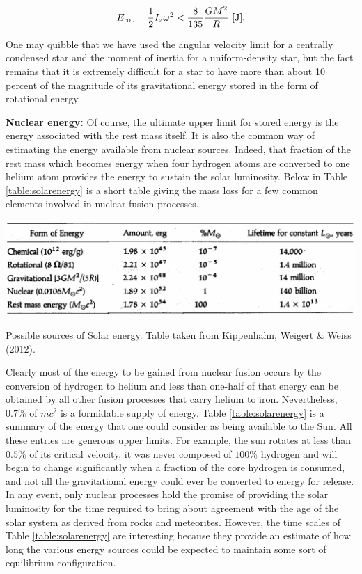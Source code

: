 \documentclass[a4paper,10pt]{article}
\begin{document}
\begin{align*}
    E_{\rm rot} = \frac{1}{2}I_z\omega^2 < \frac{8}{135}\frac{GM^2}{R} ~ [{\rm J}].
\end{align*}

{\noindent}One may quibble that we have used the angular velocity limit for a centrally condensed star and the moment of inertia for a uniform-density star, but the fact remains that it is extremely difficult for a star to have more than about 10 percent of the magnitude of its gravitational energy stored in the form of rotational energy.

{\noindent}\textbf{Nuclear energy:} Of course, the ultimate upper limit for stored energy is the energy associated with the rest mass itself. It is also the common way of estimating the energy available from nuclear sources. Indeed, that fraction of the rest mass which becomes energy when four hydrogen atoms are converted to one helium atom provides the energy to sustain the solar luminosity. Below in Table \ref{table:solarenergy} is a short table giving the mass loss for a few common elements involved in nuclear fusion processes.

\begin{table}[h]
    \centering
    \includegraphics[width=14cm]{figures/SolarEnergy.png}
    \caption{\footnotesize{Possible sources of Solar energy. Table taken from Kippenhahn, Weigert \& Weiss (2012).}}
    \label{table:solarenergy}
\end{table}

{\noindent}Clearly most of the energy to be gained from nuclear fusion occurs by the conversion of hydrogen to helium and less than one-half of that energy can be obtained by all other fusion processes that carry helium to iron. Nevertheless, $0.7\%$ of $mc^2$ is a formidable supply of energy. Table \ref{table:solarenergy} is a summary of the energy that one could consider as being available to the Sun. All these entries are generous upper limits. For example, the sun rotates at less than $0.5\%$ of its critical velocity, it was never composed of $100\%$ hydrogen and will begin to change significantly when a fraction of the core hydrogen is consumed, and not all the gravitational energy could ever be converted to energy for release. In any event, only nuclear processes hold the promise of providing the solar luminosity for the time required to bring about agreement with the age of the solar system as derived from rocks and meteorites. However, the time scales of Table \ref{table:solarenergy} are interesting because they provide an estimate of how long the various energy sources could be expected to maintain some sort of equilibrium configuration.
\end{document}
